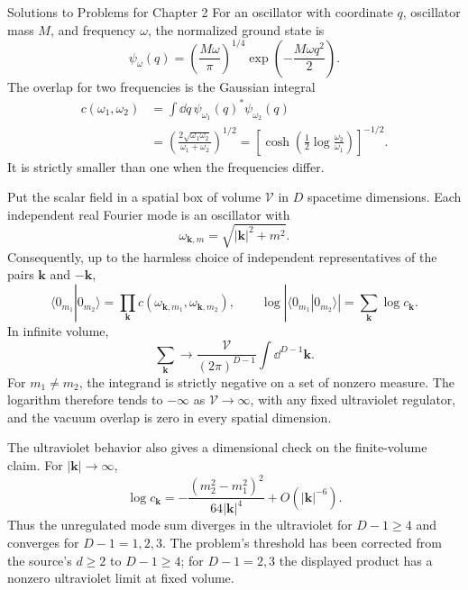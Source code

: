 \begin{bankssolutions}{Solutions to Problems for Chapter 2}
For an oscillator with coordinate $q$, oscillator mass $M$, and frequency $\omega$, the normalized ground state is
\[
  \psi_{\omega}(q)=\left(\frac{M\omega}{\pi}\right)^{1/4}
  \exp\!\left(-\frac{M\omega q^{2}}{2}\right).
\]
The overlap for two frequencies is the Gaussian integral
\begin{align*}
  c(\omega_{1},\omega_{2})
  &=\int\dd q\,\psi_{\omega_{1}}(q)^{*}\psi_{\omega_{2}}(q)\\
  &=\left(\frac{2\sqrt{\omega_{1}\omega_{2}}}{\omega_{1}+\omega_{2}}\right)^{1/2}
   =\left[\cosh\!\left(\frac12\log\frac{\omega_{2}}{\omega_{1}}\right)\right]^{-1/2}.
\end{align*}
It is strictly smaller than one when the frequencies differ.

Put the scalar field in a spatial box of volume $\mathcal V$ in $D$ spacetime dimensions. Each independent real Fourier mode is an oscillator with
\[
  \omega_{\mathbf k,m}=\sqrt{|\mathbf k|^{2}+m^{2}}.
\]
Consequently, up to the harmless choice of independent representatives of the pairs $\mathbf k$ and $-\mathbf k$,
\[
  \langle0_{m_{1}}|0_{m_{2}}\rangle
  =\prod_{\mathbf k}c(\omega_{\mathbf k,m_{1}},\omega_{\mathbf k,m_{2}}),
  \qquad
  \log|\langle0_{m_{1}}|0_{m_{2}}\rangle|
  =\sum_{\mathbf k}\log c_{\mathbf k}.
\]
In infinite volume,
\[
  \sum_{\mathbf k}\longrightarrow
  \frac{\mathcal V}{(2\pi)^{D-1}}\int\dd^{D-1}\mathbf k.
\]
For $m_{1}\ne m_{2}$, the integrand is strictly negative on a set of nonzero measure. The logarithm therefore tends to $-\infty$ as $\mathcal V\to\infty$, with any fixed ultraviolet regulator, and the vacuum overlap is zero in every spatial dimension.

The ultraviolet behavior also gives a dimensional check on the finite-volume claim. For $|\mathbf k|\to\infty$,
\[
  \log c_{\mathbf k}
  =-\frac{(m_{2}^{2}-m_{1}^{2})^{2}}{64|\mathbf k|^{4}}
   +O(|\mathbf k|^{-6}).
\]
Thus the unregulated mode sum diverges in the ultraviolet for $D-1\geq4$ and converges for $D-1=1,2,3$. The problem's threshold has been corrected from the source's $d\geq2$ to $D-1\geq4$; for $D-1=2,3$ the displayed product has a nonzero ultraviolet limit at fixed volume.


\end{bankssolutions}
